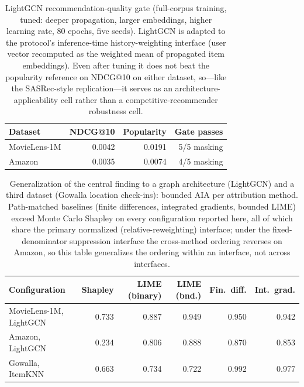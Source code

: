 \begin{table}[t]\centering\scriptsize\setlength{\tabcolsep}{3pt}
\caption{LightGCN recommendation-quality gate (full-corpus training, tuned:
deeper propagation, larger embeddings, higher learning rate, 80 epochs, five
seeds). LightGCN is adapted to the protocol's inference-time history-weighting
interface (user vector recomputed as the weighted mean of propagated item
embeddings). Even after tuning it does not beat the popularity reference on
NDCG@10 on either dataset, so---like the SASRec-style replication---it serves
as an architecture-applicability cell rather than a competitive-recommender
robustness cell.}
\label{tab:review8-lightgcn-quality}
\begin{tabular}{@{}lrrr@{}}
\toprule
Dataset & NDCG@10 & Popularity & Gate passes \\
\midrule
MovieLens-1M & 0.0042 & 0.0191 & 5/5 masking \\
Amazon & 0.0035 & 0.0074 & 4/5 masking \\
\bottomrule\end{tabular}\end{table}
\begin{table}[t]\centering\scriptsize\setlength{\tabcolsep}{3pt}
\caption{Generalization of the central finding to a graph architecture
(LightGCN) and a third dataset (Gowalla location check-ins): bounded AIA per
attribution method. Path-matched baselines (finite differences, integrated
gradients, bounded LIME) exceed Monte Carlo Shapley on every configuration reported here, all of which share the primary normalized (relative-reweighting) interface; under the fixed-denominator suppression interface the cross-method ordering reverses on Amazon, so this table generalizes the ordering within an interface, not across interfaces.}
\label{tab:review8-generalization}
\begin{tabular}{@{}lrrrrr@{}}
\toprule
Configuration & Shapley & LIME (binary) & LIME (bnd.) & Fin.\ diff. & Int.\ grad. \\
\midrule
MovieLens-1M, LightGCN & 0.733 & 0.887 & 0.949 & 0.950 & 0.942 \\
Amazon, LightGCN & 0.234 & 0.806 & 0.888 & 0.870 & 0.853 \\
Gowalla, ItemKNN & 0.663 & 0.734 & 0.722 & 0.992 & 0.977 \\
\bottomrule\end{tabular}\end{table}
